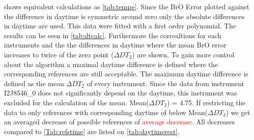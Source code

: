 \documentclass  [
  paper    = a4,
  BCOR     = 10mm,
  twoside,
  fontsize = 12pt,
  fleqn,
  toc      = bibnumbered,
  toc      = listofnumbered,
  numbers  = noendperiod,
  headings = normal,
  listof   = leveldown,
  version  = 3.03
]                                       {scrreprt}
\begin{document}
 shows equivalent calculations as \cref{tab:tempe}. Since the BrO Error plotted against the difference in daytime is symmetric around zero only the absolute differences in daytime are used. This data were fitted with a first order polynomial. The results can be seen in \cref{tab:dtcalc}. Furthermore the correaltions for each instruments and the the differences in daytime where the mean BrO error increases to twice of the zero point ($\Delta DT_{2}$) are shown. To gain more control about the algorithm a maximal daytime difference is defined where the corresponding references are still acceptable. The maximum daytime difference is defined as the mean $\Delta DT_{2}$ of every instrument. Since the data from instrument I2J8546\_0 does not significantly depend on the daytime, this instrument was excluded for the calculation of the mean. Mean($\Delta DT_{2}$) = 4.75. If restricting the data to only references with corresponding daytime of below Mean($\Delta DT_{2}$) we get an averaged decrease of possible references of \textcolor{red}{average decrease}. All decreases compared to \cref{Tab:refstime} are listed on \cref{tab:daytimerest}.
\end{document}
